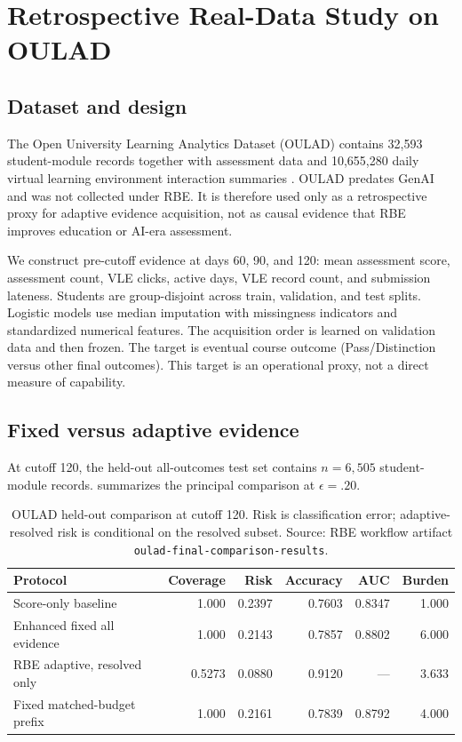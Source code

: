 \documentclass[11pt]{article}
\begin{document}
\section{Retrospective Real-Data Study on OULAD}
\subsection{Dataset and design}
The Open University Learning Analytics Dataset (OULAD) contains 32,593 student-module records together with assessment data and 10,655,280 daily virtual learning environment interaction summaries \parencite{kuzilek2017oulad}. OULAD predates GenAI and was not collected under RBE. It is therefore used only as a retrospective proxy for adaptive evidence acquisition, not as causal evidence that RBE improves education or AI-era assessment.

We construct pre-cutoff evidence at days 60, 90, and 120: mean assessment score, assessment count, VLE clicks, active days, VLE record count, and submission lateness. Students are group-disjoint across train, validation, and test splits. Logistic models use median imputation with missingness indicators and standardized numerical features. The acquisition order is learned on validation data and then frozen. The target is eventual course outcome (Pass/Distinction versus other final outcomes). This target is an operational proxy, not a direct measure of capability.

\subsection{Fixed versus adaptive evidence}
At cutoff 120, the held-out all-outcomes test set contains $n=6{,}505$ student-module records.  summarizes the principal comparison at $\epsilon=.20$.

\begin{table}[t]
\centering
\caption{OULAD held-out comparison at cutoff 120. Risk is classification error; adaptive-resolved risk is conditional on the resolved subset. Source: RBE workflow artifact \texttt{oulad-final-comparison-results}.}
\label{tab:ouladmain}
\small
\begin{tabular}{lrrrrr}
\toprule
Protocol & Coverage & Risk & Accuracy & AUC & Burden \\
\midrule
Score-only baseline & 1.000 & 0.2397 & 0.7603 & 0.8347 & 1.000 \\
Enhanced fixed all evidence & 1.000 & 0.2143 & 0.7857 & 0.8802 & 6.000 \\
RBE adaptive, resolved only & 0.5273 & 0.0880 & 0.9120 & --- & 3.633 \\
Fixed matched-budget prefix & 1.000 & 0.2161 & 0.7839 & 0.8792 & 4.000 \\
\bottomrule
\end{tabular}
\end{table}
\end{document}
